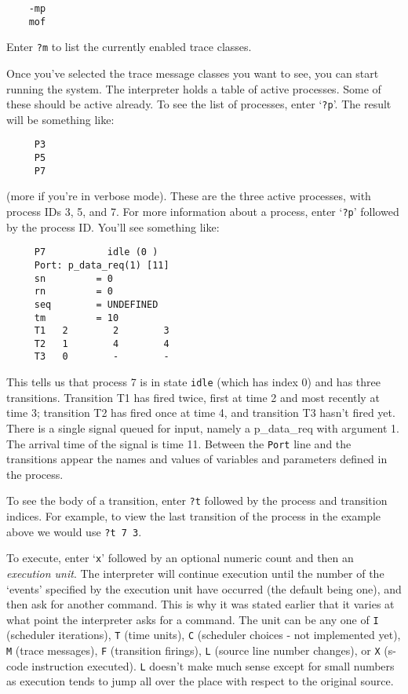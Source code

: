 \begin{verbatim}
    -mp
    mof
\end{verbatim}

Enter {\tt ?m} to list the currently enabled trace classes.

Once you've selected the trace message classes you want to see,
you can start running the system. The interpreter holds a
table of active processes. Some of these should be active
already. To see the list of processes, enter `{\tt ?p}'.
The result will be something like:

\begin{verbatim}
     P3  
     P5  
     P7  
\end{verbatim}

(more if you're in verbose mode). These are the three active
processes, with process IDs 3, 5, and 7. For more information about
a process, enter `{\tt ?p}' followed by the process ID. You'll see
something like:

\begin{verbatim}
     P7           idle (0 )
     Port: p_data_req(1) [11]
     sn         = 0
     rn         = 0
     seq        = UNDEFINED
     tm         = 10
     T1   2        2        3       
     T2   1        4        4       
     T3   0        -        -
\end{verbatim}

This tells us that process 7 is in state {\tt idle} (which has index
0) and has three transitions. Transition T1 has fired twice, first 
at time 2 and most recently at time 3; transition T2 has fired once
at time 4, and transition T3 hasn't fired yet. There is a single 
signal queued for input, namely a p\_data\_req with argument 1. The
arrival time of the signal is time 11. Between the {\tt Port} line
and the transitions appear the names and values of variables and
parameters defined in the process.

To see the body of a transition, enter {\tt ?t} followed by the
process and transition indices. For example, to view the last
transition of the process in the example above we would use
{\tt ?t 7 3}.


To execute, enter `{\tt x}' followed by an optional
numeric count and then an {\em execution unit}. The interpreter
will continue execution until the number of the `events' specified
by the execution unit have occurred (the default being one), and
then ask for another command. This is why it was stated earlier that 
it varies at what point the interpreter asks for a command. 
The unit can be any one of {\tt I} (scheduler iterations), 
{\tt T} (time units), {\tt C} (scheduler choices - not implemented yet),
{\tt M} (trace messages), {\tt F} (transition firings),
{\tt L} (source line number changes), or {\tt X} (s-code instruction
executed). {\tt L} doesn't make much sense except for small numbers
as execution tends to jump all over the place with respect to the
original source.

